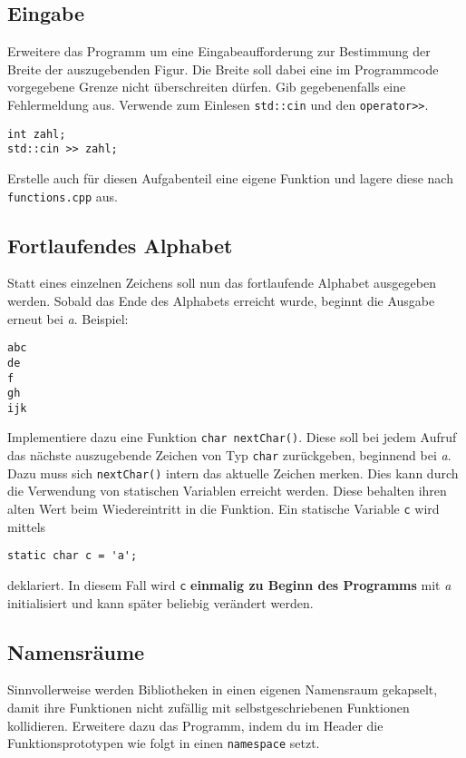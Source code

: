 \subsection{Eingabe}
Erweitere das Programm um eine Eingabeaufforderung zur Bestimmung der Breite der auszugebenden Figur.
Die Breite soll dabei eine im Programmcode vorgegebene Grenze nicht überschreiten dürfen.
Gib gegebenenfalls eine Fehlermeldung aus.
Verwende zum Einlesen \texttt{std::cin} und den \texttt{operator>>}.

\begin{lstlisting}
int zahl;
std::cin >> zahl;
\end{lstlisting}

Erstelle auch für diesen Aufgabenteil eine eigene Funktion und lagere diese nach \texttt{functions.cpp} aus.

\subsection{Fortlaufendes Alphabet}
Statt eines einzelnen Zeichens soll nun das fortlaufende Alphabet ausgegeben werden.
Sobald das Ende des Alphabets erreicht wurde, beginnt die Ausgabe erneut bei \emph{a}.
Beispiel:

\begin{lstlisting}
abc
de
f
gh
ijk
\end{lstlisting}

Implementiere dazu eine Funktion \texttt{char nextChar()}.
Diese soll bei jedem Aufruf das nächste auszugebende Zeichen von Typ \texttt{char} zurückgeben, beginnend bei \emph{a}.
Dazu muss sich \texttt{nextChar()} intern das aktuelle Zeichen merken.
Dies kann durch die Verwendung von statischen Variablen erreicht werden. Diese behalten ihren alten Wert beim Wiedereintritt in die Funktion.
Ein statische Variable \texttt{c} wird mittels

\begin{lstlisting}
static char c = 'a';
\end{lstlisting}

deklariert.
In diesem Fall wird \texttt{c} \textbf{einmalig zu Beginn des Programms} mit \emph{a} initialisiert und kann später beliebig verändert werden.


\subsection{Namensräume}
Sinnvollerweise werden Bibliotheken in einen eigenen Namensraum gekapselt, damit ihre Funktionen nicht zufällig mit selbstgeschriebenen Funktionen kollidieren.
Erweitere dazu das Programm, indem du im Header die Funktionsprototypen wie folgt in einen \texttt{namespace} setzt.

